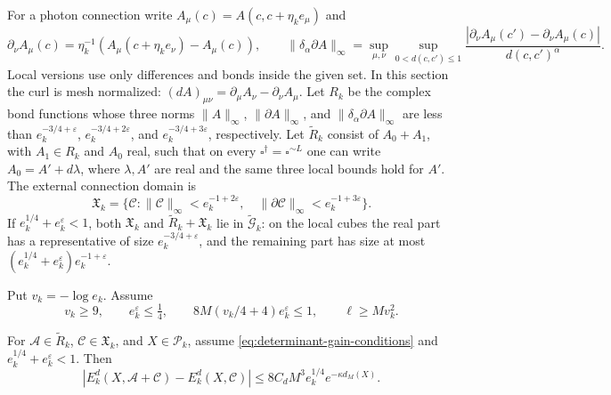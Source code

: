 For a photon connection write $A_\mu(c)=A(c,c+\eta_ke_\mu)$ and
\[
 \partial_\nu A_\mu(c)
       =\eta_k^{-1}(A_\mu(c+\eta_ke_\nu)-A_\mu(c)),\qquad
 \|\delta_\alpha\partial A\|_\infty
       =\sup_{\mu,\nu}\sup_{0<d(c,c')\le1}
          \frac{|\partial_\nu A_\mu(c')-\partial_\nu A_\mu(c)|}
               {d(c,c')^\alpha}.
\]
Local versions use only differences and bonds inside the given set.
In this section the curl is mesh normalized:
$(dA)_{\mu\nu}=\partial_\mu A_\nu-\partial_\nu A_\mu$.
Let $R_k$ be the complex bond functions whose three norms
$\|A\|_\infty$, $\|\partial A\|_\infty$, and
$\|\delta_\alpha\partial A\|_\infty$ are less than
$e_k^{-3/4+\varepsilon}$, $e_k^{-3/4+2\varepsilon}$, and
$e_k^{-3/4+3\varepsilon}$, respectively. Let $\widetilde R_k$
consist of $A_0+A_1$, with $A_1\in R_k$ and $A_0$ real, such that
on every $\square^\dagger=\square^{\sim L}$ one can write
$A_0=A'+d\lambda$, where $\lambda,A'$ are real and the same
three local bounds hold for $A'$. The external connection domain is
\[
 \mathfrak X_k=\{\mathscr C:\|\mathscr C\|_\infty
                  <e_k^{-1+2\varepsilon},\quad
             \|\partial\mathscr C\|_\infty<e_k^{-1+3\varepsilon}\}.
\]
If $e_k^{1/4}+e_k^\varepsilon<1$, both $\mathfrak X_k$ and
$\widetilde R_k+\mathfrak X_k$ lie in
$\widetilde{\mathcal G}_k$: on the local cubes the real part has
a representative of size $e_k^{-3/4+\varepsilon}$, and the
remaining part has size at most
$(e_k^{1/4}+e_k^\varepsilon)e_k^{-1+\varepsilon}$.

Put $v_k=-\log e_k$. Assume
\begin{equation}\label{eq:determinant-gain-conditions}
 v_k\ge9,\qquad e_k^\varepsilon\le\tfrac14,\qquad
 8M(v_k/4+4)e_k^\varepsilon\le1,\qquad
 \ell\ge Mv_k^2.
\end{equation}

\begin{proposition}\label{prop:determinant-small-field-gain}
For $\mathscr A\in\widetilde R_k$, $\mathscr C\in\mathfrak X_k$,
and $X\in\mathcal P_k$, assume \eqref{eq:determinant-gain-conditions}
and $e_k^{1/4}+e_k^\varepsilon<1$. Then
\begin{equation}\label{eq:determinant-small-field-gain}
 |E_k^d(X,\mathscr A+\mathscr C)-E_k^d(X,\mathscr C)|
       \le8C_dM^3e_k^{1/4}e^{-\kappa d_M(X)}.
\end{equation}
\end{proposition}

